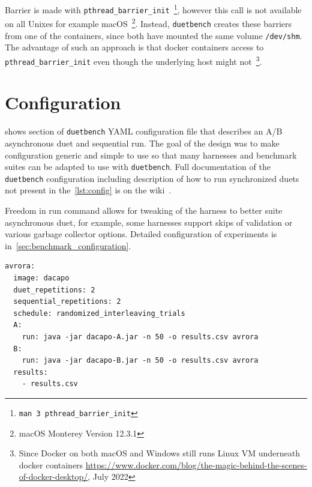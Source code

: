 Barrier is made with \lstinline{pthread_barrier_init}~\footnote{\lstinline{man 3 pthread_barrier_init}}, however this call is not available on all Unixes for example macOS~\footnote{macOS Monterey Version 12.3.1}.
Instead, \lstinline{duetbench} creates these barriers from one of the containers, since both have mounted the same volume \lstinline{/dev/shm}.
The advantage of such an approach is that docker containers access to \lstinline{pthread_barrier_init} even though the underlying host might not~\footnote{Since Docker on both macOS and Windows still runs Linux VM underneath docker containers \url{https://www.docker.com/blog/the-magic-behind-the-scenes-of-docker-desktop/}, July 2022}.

\section{Configuration}
\label{sec:configuration}

 shows section of \lstinline{duetbench} YAML configuration file that describes an A/B asynchronous duet and sequential run.
The goal of the design was to make configuration generic and simple to use so that many harnesses and benchmark suites can be adapted to use with \lstinline{duetbench}.
Full documentation of the \lstinline{duetbench} configuration including description of how to run synchronized duets not present in the~\cref{lst:config} is on the wiki~\cite{wiki}.

Freedom in run command allows for tweaking of the harness to better suite asynchronous duet, for example, some harnesses support skips of validation or various garbage collector options.
Detailed configuration of experiments is in~\cref{sec:benchmark_configuration}.

\begin{listing}
    \begin{lstlisting}
avrora:
  image: dacapo
  duet_repetitions: 2
  sequential_repetitions: 2
  schedule: randomized_interleaving_trials
  A:
    run: java -jar dacapo-A.jar -n 50 -o results.csv avrora
  B:
    run: java -jar dacapo-B.jar -n 50 -o results.csv avrora
  results:
    - results.csv
    \end{lstlisting}
    \caption{
        Example part of YAML configuration file for \lstinline{duetbench} that runs \lstinline{avrora} benchmark from the Dacapo suite.
        In this case, both A and B versions are packaged in a single container image as Java JAR archives.
        Run command specifies how to invoke the DaCapo harness --- 50 iterations, results in \lstinline{results.csv} and run only \lstinline{avrora} benchmark.
        All the result files or directories need to be specified in \lstinline{results} array field.
        Note the correspondence between user input fields from this configuration and parameters in angled brackets from~\cref{fig:duetbench_sequence}.
        Furthermore, users can specify the number of repetitions for both asynchronous duet and sequential measurements, as well as the scheduling strategy for those runs.
    }
    \label{lst:config}
\end{listing}


